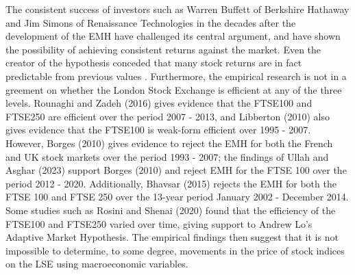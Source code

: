 \documentclass[12pt,a4paper]{article}
\begin{document}
The consistent success of investors such as Warren Buffett of 
Berkshire Hathaway and Jim Simons of Renaissance Technologies 
in the decades after the development of the EMH have challenged 
its central argument, and have shown the possibility of achieving 
consistent returns against the market. Even the creator of the 
hypothesis conceded that many stock returns are in fact predictable from 
previous values \cite{fama1991}. Furthermore, the empirical research is not in a
greement on whether the London Stock Exchange is efficient at any of the three levels. 
Rounaghi and Zadeh (2016) gives evidence that the FTSE100 and FTSE250 are efficient over the period 2007 - 2013, and Libberton (2010) also gives evidence that the FTSE100 is weak-form efficient over 1995 - 2007. However, Borges (2010) gives evidence to reject the EMH for both the French and UK stock markets over the period 1993 - 2007; the findings of Ullah and Asghar (2023) support Borges (2010) and reject EMH for the FTSE 100 over the period 2012 - 2020. Additionally, Bhavsar (2015) rejects the EMH for both the FTSE 100 and FTSE 250 over the 13-year period January 2002 - December 2014. Some studies such as Rosini and Shenai (2020) found that the efficiency of the FTSE100 and FTSE250 varied over time, giving support to Andrew Lo’s Adaptive Market Hypothesis. The empirical findings then suggest that it is not impossible to determine, to some degree, movements in the price of stock indices on the LSE using macroeconomic variables.
\end{document}
